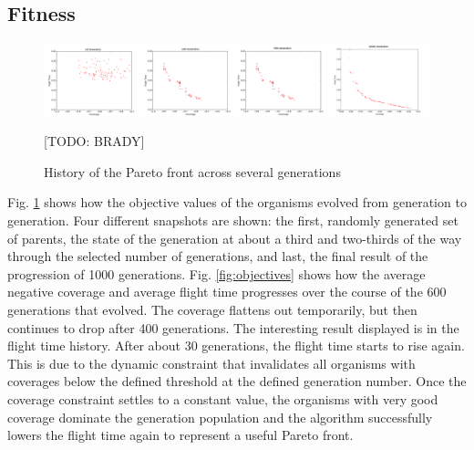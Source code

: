 \documentclass[letterpaper, 10 pt, conference]{ieeeconf}  %
\newcommand{\todo}[1]{{\color{blue}[TODO: #1]}}
\begin{document}
\subsection{Fitness}

\begin{figure}
\centering
\includegraphics[width=1.0\linewidth]{figures/pareto_history2.png}
\caption{History of the Pareto front across several generations}
\label{fig:pareto_cheetos}

\todo{BRADY}

\end{figure}

Fig. \ref{fig:pareto_cheetos} shows how the objective values of the organisms evolved from generation to generation. Four different snapshots are shown: the first, randomly generated set of parents, the state of the generation at about a third and two-thirds of the way through the selected number of generations, and last, the final result of the progression of 1000 generations. Fig. \ref{fig:objectives} shows how the average negative coverage and average flight time progresses over the course of the 600 generations that evolved. The coverage flattens out temporarily, but then continues to drop after 400 generations. The interesting result displayed is in the flight time history. After about 30 generations, the flight time starts to rise again. This is due to the dynamic constraint that invalidates all organisms with coverages below the defined threshold at the defined generation number. Once the coverage constraint settles to a constant value, the organisms with very good coverage dominate the generation population and the algorithm successfully lowers the flight time again to represent a useful Pareto front.
\end{document}
